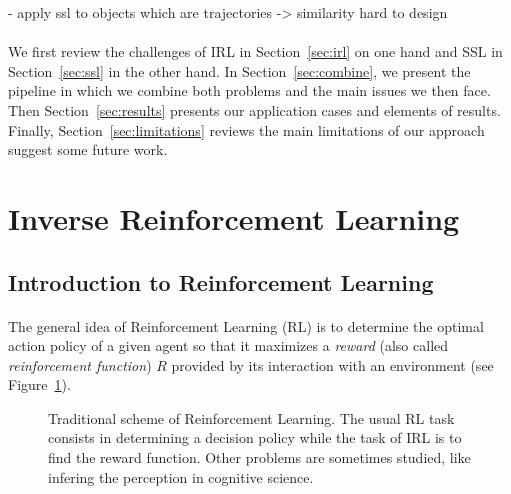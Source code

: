 \documentclass{article}
\begin{document}
 - apply ssl to objects which are trajectories -> similarity hard to design

\paragraph{}
We first review the challenges of IRL in Section~\ref{sec:irl} on one hand and SSL in Section~\ref{sec:ssl} in the other hand. In Section~\ref{sec:combine}, we present the pipeline in which we combine both problems and the main issues we then face. Then Section~\ref{sec:results} presents our application cases and elements of results. Finally, Section~\ref{sec:limitations} reviews the main limitations of our approach suggest some future work.


\section{Inverse Reinforcement Learning \label{sec:irl}}

\subsection{Introduction to Reinforcement Learning}

\paragraph{}
The general idea of Reinforcement Learning (RL) \cite{Sutton98} is to determine the optimal action policy of a given agent so that it maximizes a \emph{reward} (also called \emph{reinforcement function}) $R$ provided by its interaction with an environment (see Figure~\ref{fig:rl}).

\begin{figure}
\begin{center}
\end{center}
\caption{Traditional scheme of Reinforcement Learning. The usual RL task consists in determining a decision policy while the task of IRL is to find the reward function. Other problems are sometimes studied, like infering the perception in cognitive science. \label{fig:rl}}
\end{figure}
\end{document}
